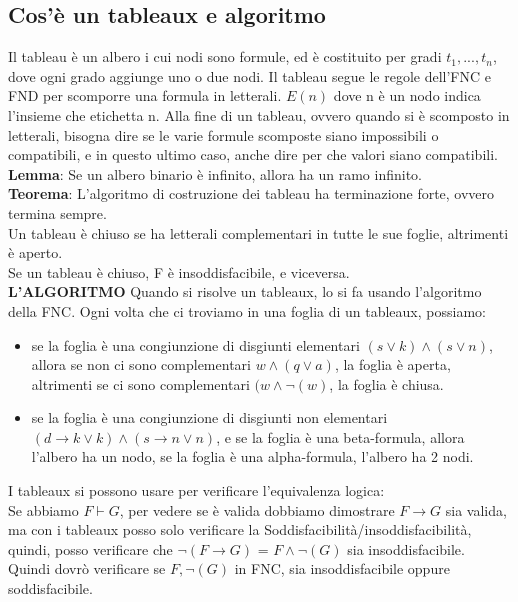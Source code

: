 \documentclass[11pt]{article}
\begin{document}
\subsection{Cos'è un tableaux e algoritmo}
Il tableau è un albero i cui nodi sono formule, ed è costituito per gradi $t_{1},...,t_{n}$, dove ogni grado aggiunge uno o due nodi. Il tableau segue le regole dell'FNC e FND per scomporre una formula in letterali. $E(n)$ dove n è un nodo indica l'insieme che etichetta n. Alla fine di un tableau, ovvero quando si è scomposto in letterali, bisogna dire se le varie formule scomposte siano impossibili o compatibili, e in questo ultimo caso, anche dire per che valori siano compatibili.\\
\textbf{Lemma}: Se un albero binario è infinito, allora ha un ramo infinito.\\
\textbf{Teorema}: L'algoritmo di costruzione dei tableau ha terminazione forte, ovvero termina sempre.\\
Un tableau è chiuso se ha letterali complementari in tutte le sue foglie, altrimenti è aperto.\\
Se un tableau è chiuso, F è insoddisfacibile, e viceversa.\\
\textbf{L'ALGORITMO}
Quando si risolve un tableaux, lo si fa usando l'algoritmo della FNC. Ogni volta che ci troviamo in una foglia di un tableaux, possiamo:
\begin{itemize}
    \item se la foglia è una congiunzione di disgiunti elementari $(s \lor k) \land (s \lor n)$, allora se non ci sono complementari $w \land (q \lor a)$, la foglia è aperta, altrimenti se ci sono complementari $(w \land \neg(w)$, la foglia è chiusa.
    \item se la foglia è una congiunzione di disgiunti non elementari $(d \rightarrow k \lor k) \land (s \rightarrow n \lor n)$, e se la foglia è una beta-formula, allora l'albero ha un nodo, se la foglia è una alpha-formula, l'albero ha 2 nodi.
\end{itemize}

I tableaux si possono usare per verificare l'equivalenza logica:\\
Se abbiamo $F \vdash G$, per vedere se è valida dobbiamo dimostrare $F \rightarrow G$ sia valida, ma con i tableaux posso solo verificare la Soddisfacibilità/insoddisfacibilità, quindi, posso verificare che $\neg(F \rightarrow G)$ = $F \land \neg(G)$ sia insoddisfacibile.\\
Quindi dovrò verificare se $F,\neg(G)$ in FNC, sia insoddisfacibile oppure soddisfacibile.
\end{document}
